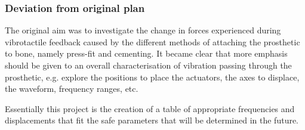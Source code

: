 \subsubsection*{Deviation from original plan}
The original aim was to investigate the change in forces experienced during vibrotactile feedback caused by the different methods of attaching the prosthetic to bone, namely press-fit and cementing.
It became clear that more emphasis should be given to an overall characterisation of vibration passing through the prosthetic, e.g. explore the positions to place the actuators, the axes to displace, the waveform, frequency ranges, etc.

Essentially this project is the creation of a table of appropriate frequencies and displacements that fit the safe parameters that will be determined in the future.